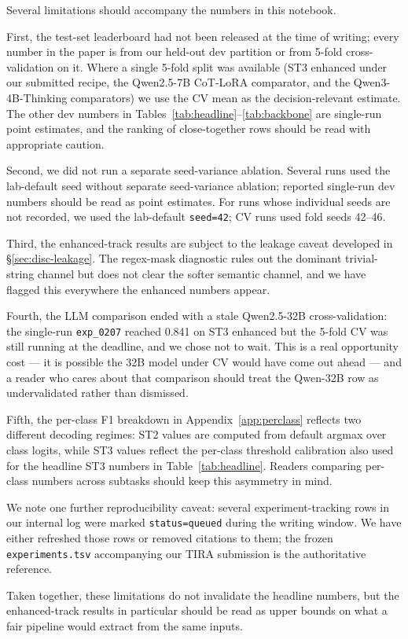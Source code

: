 Several limitations should accompany the numbers in this notebook.

First, the test-set leaderboard had not been released at the time of writing; every number in the paper is from our held-out dev partition or from 5-fold cross-validation on it. Where a single 5-fold split was available (ST3 enhanced under our submitted recipe, the Qwen2.5-7B CoT-LoRA comparator, and the Qwen3-4B-Thinking comparators) we use the CV mean as the decision-relevant estimate. %
The other dev numbers in Tables~\ref{tab:headline}--\ref{tab:backbone} are single-run point estimates, and the ranking of close-together rows should be read with appropriate caution.

Second, we did not run a separate seed-variance ablation. Several runs used the lab-default seed without separate seed-variance ablation; reported single-run dev numbers should be read as point estimates. %
For runs whose individual seeds are not recorded, we used the lab-default \texttt{seed=42}; CV runs used fold seeds 42--46.

Third, the enhanced-track results are subject to the leakage caveat developed in \S\ref{sec:disc-leakage}. The regex-mask diagnostic rules out the dominant trivial-string channel but does not clear the softer semantic channel, and we have flagged this everywhere the enhanced numbers appear. %

Fourth, the LLM comparison ended with a stale Qwen2.5-32B cross-validation: the single-run \texttt{exp\_0207} reached 0.841 on ST3 enhanced but the 5-fold CV was still running at the deadline, %
and we chose not to wait. This is a real opportunity cost --- it is possible the 32B model under CV would have come out ahead --- and a reader who cares about that comparison should treat the Qwen-32B row as undervalidated rather than dismissed.

Fifth, the per-class F1 breakdown in Appendix~\ref{app:perclass} reflects two different decoding regimes: ST2 values are computed from default argmax over class logits, while ST3 values reflect the per-class threshold calibration also used for the headline ST3 numbers in Table~\ref{tab:headline}. Readers comparing per-class numbers across subtasks should keep this asymmetry in mind. %

We note one further reproducibility caveat: several experiment-tracking rows in our internal log were marked \texttt{status=queued} during the writing window. We have either refreshed those rows or removed citations to them; the frozen \texttt{experiments.tsv} accompanying our TIRA submission is the authoritative reference.

Taken together, these limitations do not invalidate the headline numbers, but the enhanced-track results in particular should be read as upper bounds on what a fair pipeline would extract from the same inputs.
